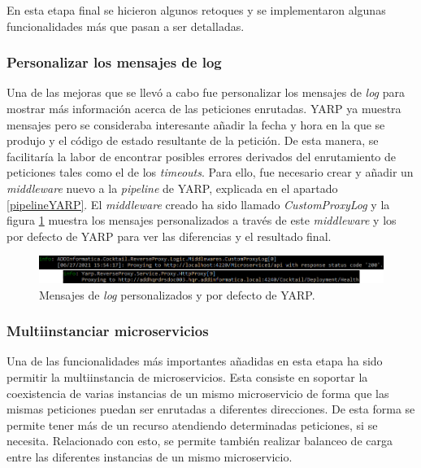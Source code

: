 \documentclass[11pt,spanish,listoffigures]{tfgetsinf}
\begin{document}
En esta etapa final se hicieron algunos retoques y se implementaron algunas funcionalidades más que pasan a ser detalladas.


			\subsubsection{Personalizar los mensajes de log}

Una de las mejoras que se llevó a cabo fue personalizar los mensajes de \emph{log} para mostrar más información acerca de las peticiones enrutadas. YARP ya muestra mensajes pero se consideraba interesante añadir la fecha y hora en la que se produjo y el código de estado resultante de la petición. De esta manera, se facilitaría la labor de encontrar posibles errores derivados del enrutamiento de peticiones tales como el de los \emph{timeouts}. Para ello, fue necesario crear y añadir un \emph{middleware} nuevo a la \emph{pipeline} de YARP, explicada en el apartado \ref{pipelineYARP}. El \emph{middleware} creado ha sido llamado \emph{CustomProxyLog} y la figura \ref{logs} muestra los mensajes personalizados a través de este \emph{middleware} y los por defecto de YARP para ver las diferencias y el resultado final.

\begin{figure}[ht]
\centering
\includegraphics[width=1\textwidth]{imagenes/logs}
\caption{Mensajes de \emph{log} personalizados y por defecto de YARP.}
	\label{logs}
\end{figure}


			\subsubsection{Multiinstanciar microservicios}

Una de las funcionalidades más importantes añadidas en esta etapa ha sido permitir la multiinstancia de microservicios. Esta consiste en soportar la coexistencia de varias instancias de un mismo microservicio de forma que las mismas peticiones puedan ser enrutadas a diferentes direcciones. De esta forma se permite tener más de un recurso atendiendo determinadas peticiones, si se necesita. Relacionado con esto, se permite también realizar balanceo de carga entre las diferentes instancias de un mismo microservicio.
\end{document}
